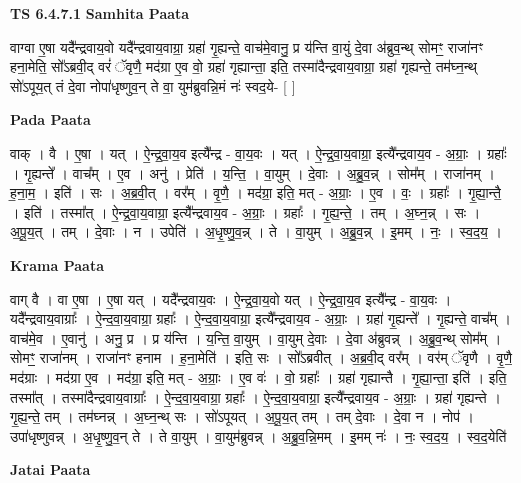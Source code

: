 \documentclass[17pt]{extarticle}
\begin{document}
\textbf{TS 6.4.7.1 } \newline
\textbf{Samhita Paata} \newline

वाग्वा ए॒षा यदै᳚न्द्रवाय॒वो यदै᳚न्द्रवाय॒वाग्रा॒ ग्रहा॑ गृ॒ह्यन्ते॒ वाच॑मे॒वानु॒ प्र य॑न्ति वा॒युं दे॒वा अ॑ब्रुव॒न्थ् सोमꣳ॒॒ राजा॑नꣳ हना॒मेति॒ सो᳚ऽब्रवी॒द् वरं॑ ॅवृणै॒ मद॑ग्रा ए॒व वो॒ ग्रहा॑ गृह्यान्ता॒ इति॒ तस्मा॑दैन्द्रवाय॒वाग्रा॒ ग्रहा॑ गृह्यन्ते॒ तम॑घ्न॒न्थ् सो॑ऽपूय॒त् तं दे॒वा नोपा॑धृष्णुव॒न् ते वा॒ युम॑ब्रुवन्नि॒मं नः॑ स्वद॒ये- [  ] \newline

\textbf{Pada Paata} \newline

वाक् । वै । ए॒षा । यत् । ऐ॒न्द्र॒वा॒य॒व इत्यै᳚न्द्र - वा॒य॒वः । यत् । ऐ॒न्द्र॒वा॒य॒वाग्रा॒ इत्यै᳚न्द्रवाय॒व - अ॒ग्राः॒ । ग्रहाः᳚ । गृ॒ह्यन्ते᳚ । वाच᳚म् । ए॒व । अनु॑ । प्रेति॑ । य॒न्ति॒ । वा॒युम् । दे॒वाः । अ॒ब्रु॒व॒न्न् । सोम᳚म् । राजा॑नम् । ह॒ना॒म॒ । इति॑ । सः । अ॒ब्र॒वी॒त् । वर᳚म् । वृ॒णै॒ । मद॑ग्रा॒ इति॒ मत् - अ॒ग्राः॒ । ए॒व । वः॒ । ग्रहाः᳚ । गृ॒ह्या॒न्तै॒ । इति॑ । तस्मा᳚त् । ऐ॒न्द्र॒वा॒य॒वाग्रा॒ इत्यै᳚न्द्रवाय॒व - अ॒ग्राः॒ । ग्रहाः᳚ । गृ॒ह्य॒न्ते॒ । तम् । अ॒घ्न॒न्न् । सः । अ॒पू॒य॒त् । तम् । दे॒वाः । न । उपेति॑ । अ॒धृ॒ष्णु॒व॒न्न् । ते । वा॒युम् । अ॒ब्रु॒व॒न्न् । इ॒मम् । नः॒ । स्व॒द॒य॒ ।  \newline


\textbf{Krama Paata} \newline

वाग् वै । वा ए॒षा । ए॒षा यत् । यदै᳚न्द्रवाय॒वः । ऐ॒न्द्र॒वा॒य॒वो यत् । ऐ॒न्द्र॒वा॒य॒व इत्यै᳚न्द्र - वा॒य॒वः । यदै᳚न्द्रवाय॒वाग्राः᳚ । ऐ॒न्द॒वा॒य॒वाग्रा॒ ग्रहाः᳚ । ऐ॒न्द॒वा॒य॒वाग्रा॒ इत्यै᳚न्द्रवाय॒व - अ॒ग्राः॒ । ग्रहा॑ गृ॒ह्यन्ते᳚ । गृ॒ह्यन्ते॒ वाच᳚म् । वाच॑मे॒व । ए॒वानु॑ । अनु॒ प्र । प्र य॑न्ति । य॒न्ति॒ वा॒युम् । वा॒युम् दे॒वाः । दे॒वा अ॑ब्रुवन्न् । अ॒ब्रु॒व॒न्थ् सोम᳚म् । सोमꣳ॒॒ राजा॑नम् । राजा॑नꣳ हनाम । ह॒ना॒मेति॑ । इति॒ सः । सो᳚ऽब्रवीत् । अ॒ब्र॒वी॒द् वर᳚म् । वर॑म् ॅवृणै । वृ॒णै॒ मद॑ग्राः । मद॑ग्रा ए॒व । मद॑ग्रा॒ इति॒ मत् - अ॒ग्राः॒ । ए॒व वः॑ । वो॒ ग्रहाः᳚ । ग्रहा॑ गृह्यान्तै । गृ॒ह्या॒न्ता॒ इति॑ । इति॒ तस्मा᳚त् । तस्मा॑दैन्द्रवाय॒वाग्राः᳚ । ऐ॒न्द॒वा॒य॒वाग्रा॒ ग्रहाः᳚ । ऐ॒न्द॒वा॒य॒वाग्रा॒ इत्यै᳚न्द्रवाय॒व - अ॒ग्राः॒ । ग्रहा॑ गृह्यन्ते । गृ॒ह्य॒न्ते॒ तम् । तम॑घ्नन्न् । अ॒घ्न॒न्थ् सः । सो॑ऽपूयत् । अ॒पू॒य॒त् तम् । तम् दे॒वाः । दे॒वा न । नोप॑ । उपा॑धृष्णुवन्न् । अ॒धृ॒ष्णु॒व॒न् ते । ते वा॒युम् । वा॒युम॑ब्रुवन्न् । अ॒ब्रु॒व॒न्नि॒मम् । इ॒मम् नः॑ । नः॒ स्व॒द॒य॒ । स्व॒द॒येति॑ \newline

\textbf{Jatai Paata} \newline
\end{document}
